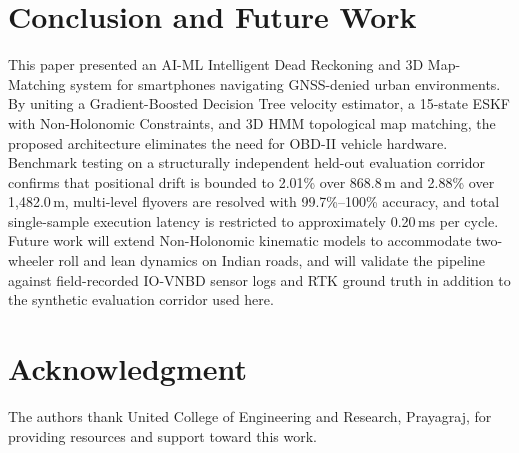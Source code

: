 \documentclass[conference]{IEEEtran}
\begin{document}
\section{Conclusion and Future Work}

This paper presented an AI-ML Intelligent Dead Reckoning and 3D Map-Matching system for smartphones navigating GNSS-denied urban environments. By uniting a Gradient-Boosted Decision Tree velocity estimator, a 15-state ESKF with Non-Holonomic Constraints, and 3D HMM topological map matching, the proposed architecture eliminates the need for OBD-II vehicle hardware. Benchmark testing on a structurally independent held-out evaluation corridor confirms that positional drift is bounded to 2.01\% over 868.8\,m and 2.88\% over 1{,}482.0\,m, multi-level flyovers are resolved with 99.7\%--100\% accuracy, and total single-sample execution latency is restricted to approximately 0.20\,ms per cycle. Future work will extend Non-Holonomic kinematic models to accommodate two-wheeler roll and lean dynamics on Indian roads, and will validate the pipeline against field-recorded IO-VNBD sensor logs and RTK ground truth in addition to the synthetic evaluation corridor used here.

\section*{Acknowledgment}
The authors thank United College of Engineering and Research, Prayagraj, for providing resources and support toward this work.
\end{document}

